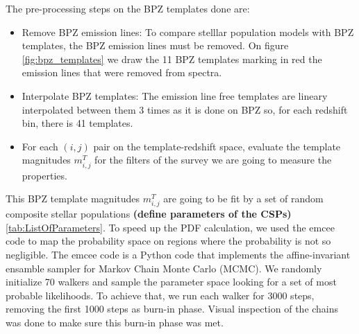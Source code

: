 \documentclass[9pt]{memoir}
\begin{document}
The pre-processing steps on the BPZ templates done are:

\begin{itemize}
\item Remove BPZ emission lines: To compare stelllar population models with BPZ templates, the BPZ emission lines must be removed. On figure \ref{fig:bpz_templates} we draw the 11 BPZ templates marking in red the emission lines that were removed from spectra.

\item Interpolate BPZ templates: The emission line free templates are lineary interpolated between them 3 times as it is done on BPZ so, for each redshift bin, there is 41 templates.

\item For each $(i, j)$ pair on the template-redshift space, evaluate the template magnitudes $m^T_{i,j}$ for the filters of the survey we are going to measure the properties.

\end{itemize}

This BPZ template magnitudes $m^T_{i,j}$ are going to be fit by a set of random composite stellar populations \textbf{(define parameters of the CSPs)} \ref{tab:ListOfParameters}. To speed up the PDF calculation, we used the emcee code \citep{ForemanMackey.etal.2013a} to map the probability space on regions where the probability is not so negligible. The emcee code is a Python code that implements the affine-invariant ensamble sampler for Markov Chain Monte Carlo (MCMC). We randomly initialize 70 walkers and sample the parameter space looking for a set of most probable likelihoods. To achieve that, we run each walker for 3000 steps, removing the first 1000 steps as burn-in phase. Visual inspection of the chains was done to make sure this burn-in phase was met.

\end{document}
